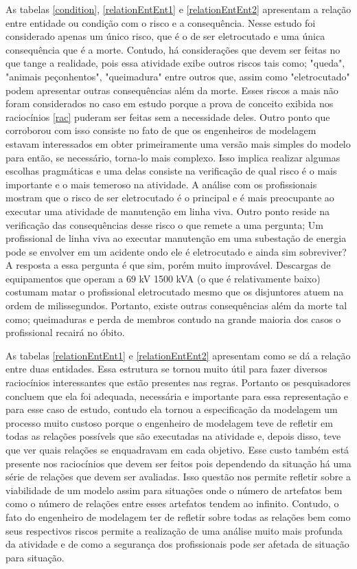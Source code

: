 As tabelas \ref{condition}, \ref{relationEntEnt1} e \ref{relationEntEnt2} apresentam a relação entre entidade ou condição com o risco e a consequência. Nesse estudo foi considerado apenas um 
único risco, que é o de ser eletrocutado e uma única consequência que é a morte. Contudo, há considerações que devem ser feitas no que tange a realidade, pois essa atividade exibe outros 
riscos tais como; "queda", "animais peçonhentos", "queimadura" entre outros que, assim como "eletrocutado" podem apresentar outras consequências além da morte. Esses riscos a mais não foram 
considerados no caso em estudo porque a prova de conceito exibida nos raciocínios \ref{rac} puderam ser feitas sem a necessidade deles. Outro ponto que corroborou com isso consiste no fato 
de que os engenheiros de modelagem estavam interessados em obter primeiramente uma versão mais simples do modelo para então, se necessário, torna-lo mais complexo. Isso implica realizar 
algumas escolhas pragmáticas e uma delas consiste na verificação de qual risco é o mais importante e o mais temeroso na atividade. A análise com os profissionais mostram que o risco de 
ser eletrocutado é o principal e é mais preocupante ao executar uma atividade de manutenção em linha viva. Outro ponto reside na verificação das consequências desse risco o que remete 
a uma pergunta; Um profissional de linha viva ao executar manutenção em uma subestação de energia pode se envolver em um acidente ondo ele é eletrocutado e ainda sim sobreviver? A resposta 
a essa pergunta é que sim, porém muito improvável. Descargas de equipamentos que operam a 69 kV 1500 kVA  (o que é relativamente baixo) costumam matar o profissional eletrocutado mesmo que 
os disjuntores atuem na ordem de milissegundos. Portanto, existe outras consequências além da morte tal como; queimaduras e perda de membros contudo na grande maioria dos casos o profissional 
recairá no óbito. 

As tabelas \ref{relationEntEnt1} e \ref{relationEntEnt2} apresentam como se dá a relação entre duas entidades. Essa estrutura se tornou muito útil para fazer diversos raciocínios interessantes
que estão presentes nas regras. Portanto os pesquisadores concluem que ela foi adequada, necessária e importante para essa representação e para esse caso de estudo, contudo ela tornou a 
especificação da modelagem um processo muito custoso porque o engenheiro de modelagem teve de refletir em todas as relações possívels que são executadas na atividade e, depois disso, teve 
que ver quais relações se enquadravam em cada objetivo. Esse custo também está presente nos raciocínios que devem ser feitos pois dependendo da situação há uma série de relações que devem 
ser avaliadas. Isso questão nos permite refletir sobre a viabilidade de um modelo assim para situações onde o número de artefatos bem como o número de relações entre esses artefatos tendem ao 
infinito. Contudo, o fato do engenheiro de modelagem ter de refletir sobre todas as relações bem como seus respectivos riscos permite a realização de uma análise muito mais profunda 
da atividade e de como a segurança dos profissionais pode ser afetada de situação para situação. 

